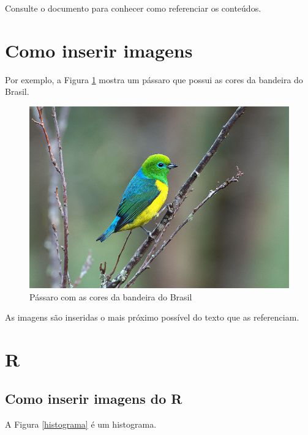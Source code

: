 \documentclass[
	12pt,				%
	oneside,			%
	a4paper,			%
	english,			%
	french,				%
	spanish,			%
	brazil				%
	]{abntex2}
\begin{document}
Consulte o documento  para conhecer como
referenciar os conteúdos.

\hypertarget{como-inserir-imagens}{%
\section{Como inserir imagens}\label{como-inserir-imagens}}

Por exemplo, a Figura \ref{passaro} mostra um pássaro que possui as
cores da bandeira do Brasil.

\begin{figure}[htbp]
\hypertarget{passaro}{%
\caption{Pássaro com as cores da bandeira do Brasil}\label{passaro}
\begin{center}
\includegraphics[scale=0.4]{imagens/passaro.jpg}
\end{center}
}
\end{figure}

As imagens são inseridas o mais próximo possível do texto que as
referenciam.

\hypertarget{r}{%
\section{R}\label{r}}

\hypertarget{como-inserir-imagens-do-r}{%
\subsection{Como inserir imagens do R}\label{como-inserir-imagens-do-r}}

A Figura \ref{histograma} é um histograma.
\end{document}
